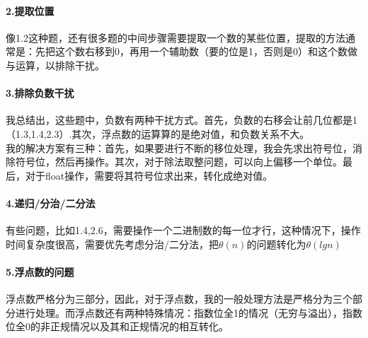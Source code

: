 \documentclass{article}
\begin{document}
\begin{CJK}{UTF8}{gkai}
\paragraph{2.提取位置}像1.2这种题，还有很多题的中间步骤需要提取一个数的某些位置，提取的方法通常是：先把这个数右移到0，再用一个辅助数（要的位是1，否则是0）和这个数做与运算，以排除干扰。\\
\paragraph{3.排除负数干扰}我总结出，这些题中，负数有两种干扰方式。首先，负数的右移会让前几位都是1（1.3,1.4,2.3）.其次，浮点数的运算算的是绝对值，和负数关系不大。\\
我的解决方案有三种：首先，如果要进行不断的移位处理，我会先求出符号位，消除符号位，然后再操作。其次，对于除法取整问题，可以向上偏移一个单位。最后，对于float操作，需要将其符号位求出来，转化成绝对值。
\paragraph{4.递归/分治/二分法}有些问题，比如1.4,2.6，需要操作一个二进制数的每一位才行，这种情况下，操作时间复杂度很高，需要优先考虑分治/二分法，把$\theta(n)$的问题转化为$\theta(lgn)$\\
\paragraph{5.浮点数的问题}浮点数严格分为三部分，因此，对于浮点数，我的一般处理方法是严格分为三个部分进行处理。而浮点数还有两种特殊情况：指数位全1的情况（无穷与溢出），指数位全0的非正规情况以及其和正规情况的相互转化。


\end{CJK}
\end{document}

